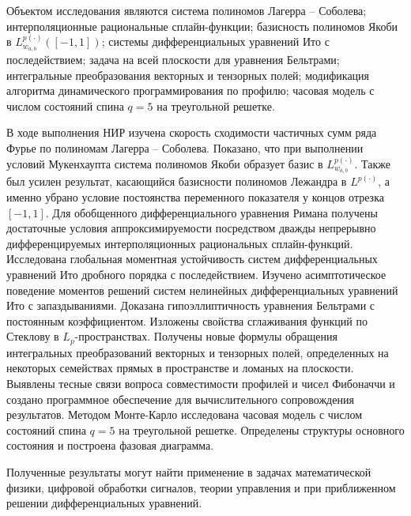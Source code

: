 


Объектом исследования являются система полиномов Лагерра -- Соболева; интерполяционные рациональные сплайн-функции;
базисность полиномов Якоби в $L^{p(\cdot)}_{w_{a,b}}([-1,1])$;
системы дифференциальных уравнений Ито с последействием;
задача на всей плоскости для уравнения Бельтрами;
интегральные преобразования векторных и тензорных полей;
модификация алгоритма динамического программирования по профилю;
часовая модель с числом состояний спина $q=5$ на треугольной решетке.

В ходе выполнения НИР изучена  скорость сходимости частичных сумм ряда Фурье по полиномам Лагерра -- Соболева. 
Показано, что при выполнении условий Мукенхаупта система полиномов Якоби образует базис в $L^{p(\cdot)}_{w_{a,b}}$. 
Также был усилен результат, касающийся базисности полиномов Лежандра в $L^{p(\cdot)}$, а именно убрано условие постоянства переменного показателя у концов отрезка $[-1,1]$.
Для обобщенного дифференциального уравнения Римана получены достаточные условия аппроксимируемости посредством дважды непрерывно
 дифференцируемых интерполяционных рациональных сплайн-функций.
Исследована глобальная моментная устойчивость систем дифференциальных уравнений Ито дробного порядка с последействием. Изучено асимптотическое поведение моментов решений систем нелинейных дифференциальных уравнений Ито с запаздываниями.
Доказана гипоэллиптичность уравнения Бельтрами с постоянным коэффициентом. Изложены свойства сглаживания функций по Стеклову в $L_p$-пространствах.
Получены новые формулы обращения интегральных преобразований векторных и тензорных полей, определенных на некоторых семействах прямых в пространстве и ломаных на плоскости.
Выявлены тесные связи вопроса совместимости профилей и чисел Фибоначчи и создано программное обеспечение для вычислительного сопровождения результатов.
Методом Монте-Карло исследована часовая модель с числом состояний спина $q=5$ на треугольной решетке. Определены структуры основного состояния и построена фазовая диаграмма.

Полученные результаты могут найти применение в задачах математической физики, цифровой обработки сигналов, теории управления и при приближенном решении дифференциальных уравнений.